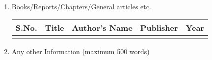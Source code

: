 \documentclass[12pt,a4paper]{article}
\begin{document}
\begin{enumerate}
	\item 	Books/Reports/Chapters/General articles etc.	\\
			\begin{tabular}{|p{1cm}|p{3cm}|p{4cm}|p{3cm}|p{2.5cm}|}
				\hline
				S.No. 	&Title 		&Author’s Name 		&Publisher 		&Year 	\\
				\hline
				 & & & & \\
				\hline
			\end{tabular}					
	
	\item 	Any other Information (maximum 500 words) \\
			
\end{enumerate}
\end{document}
